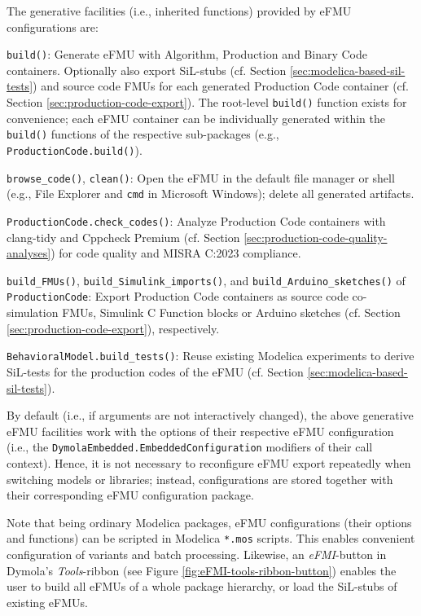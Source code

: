 The generative facilities (i.e., inherited functions) provided by eFMU configurations are:

\squishlist
    \item \texttt{build()}: Generate eFMU with Algorithm, Production and Binary Code containers. Optionally also export SiL-stubs (cf. Section \ref{sec:modelica-based-sil-tests}) and source code FMUs for each generated Production Code container (cf. Section \ref{sec:production-code-export}). The root-level \texttt{build()} function exists for convenience; each eFMU container can be individually generated within the \texttt{build()} functions of the respective sub-packages (e.g., \texttt{ProductionCode.build()}).
    \item \texttt{browse\_code()}, \texttt{clean()}: Open the eFMU in the default file manager or shell (e.g., File Explorer and \texttt{cmd} in Microsoft Windows); delete all generated artifacts.
    \item \texttt{ProductionCode.check\_codes()}: Analyze Production Code containers with clang-tidy and Cppcheck Premium (cf. Section \ref{sec:production-code-quality-analyses}) for code quality and MISRA C:2023 compliance.
    \item \texttt{build\_FMUs()}, \texttt{build\_Simulink\_imports()}, and \texttt{build\_Arduino\_sketches()} of \texttt{ProductionCode}: Export Production Code containers as source code co-simulation FMUs, Simulink\regtm{} C Function blocks or Arduino\regtm{} sketches (cf. Section \ref{sec:production-code-export}), respectively.
    \item \texttt{BehavioralModel.build\_tests()}: Reuse existing Modelica experiments to derive SiL-tests for the production codes of the eFMU (cf. Section \ref{sec:modelica-based-sil-tests}).
\squishend

\noindent{}By default (i.e., if arguments are not interactively changed), the above generative eFMU facilities work with the options of their respective eFMU configuration (i.e., the \texttt{DymolaEmbedded.EmbeddedConfiguration} modifiers of their call context). Hence, it is not necessary to reconfigure eFMU export repeatedly when switching models or libraries; instead, configurations are stored together with their corresponding eFMU configuration package.

Note that being ordinary Modelica packages, eFMU configurations (their options and functions) can be scripted in Modelica \texttt{*.mos} scripts. This enables convenient configuration of variants and batch processing. Likewise, an \textit{eFMI}-button in Dymola's \textit{Tools}-ribbon (see Figure \ref{fig:eFMI-tools-ribbon-button}) enables the user to build all eFMUs of a whole package hierarchy, or load the SiL-stubs of existing eFMUs.

